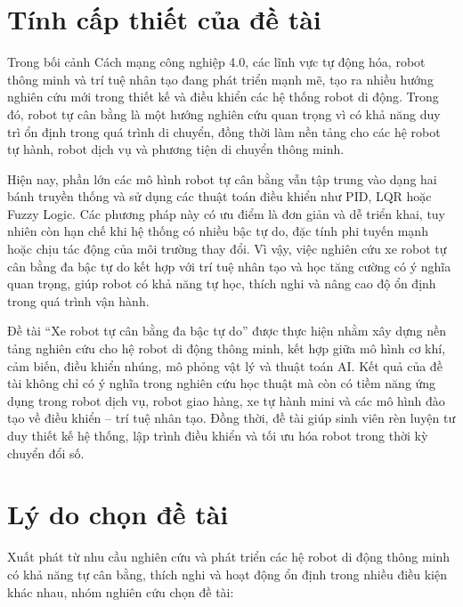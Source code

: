 \section{Tính cấp thiết của đề tài}

Trong bối cảnh Cách mạng công nghiệp 4.0, các lĩnh vực tự động hóa, robot thông minh
và trí tuệ nhân tạo đang phát triển mạnh mẽ, tạo ra nhiều hướng nghiên cứu mới trong
thiết kế và điều khiển các hệ thống robot di động. Trong đó, robot tự cân bằng là một
hướng nghiên cứu quan trọng vì có khả năng duy trì ổn định trong quá trình di chuyển,
đồng thời làm nền tảng cho các hệ robot tự hành, robot dịch vụ và phương tiện di chuyển
thông minh.

Hiện nay, phần lớn các mô hình robot tự cân bằng vẫn tập trung vào dạng hai bánh truyền
thống và sử dụng các thuật toán điều khiển như PID, LQR hoặc Fuzzy Logic. Các phương pháp
này có ưu điểm là đơn giản và dễ triển khai, tuy nhiên còn hạn chế khi hệ thống có nhiều
bậc tự do, đặc tính phi tuyến mạnh hoặc chịu tác động của môi trường thay đổi. Vì vậy,
việc nghiên cứu xe robot tự cân bằng đa bậc tự do kết hợp với trí tuệ nhân tạo và học
tăng cường có ý nghĩa quan trọng, giúp robot có khả năng tự học, thích nghi và nâng cao
độ ổn định trong quá trình vận hành.

Đề tài ``Xe robot tự cân bằng đa bậc tự do'' được thực hiện nhằm xây dựng nền tảng nghiên
cứu cho hệ robot di động thông minh, kết hợp giữa mô hình cơ khí, cảm biến, điều khiển
nhúng, mô phỏng vật lý và thuật toán AI. Kết quả của đề tài không chỉ có ý nghĩa trong
nghiên cứu học thuật mà còn có tiềm năng ứng dụng trong robot dịch vụ, robot giao hàng,
xe tự hành mini và các mô hình đào tạo về điều khiển -- trí tuệ nhân tạo. Đồng thời, đề
tài giúp sinh viên rèn luyện tư duy thiết kế hệ thống, lập trình điều khiển và tối ưu
hóa robot trong thời kỳ chuyển đổi số.

\section{Lý do chọn đề tài}

Xuất phát từ nhu cầu nghiên cứu và phát triển các hệ robot di động thông minh có khả
năng tự cân bằng, thích nghi và hoạt động ổn định trong nhiều điều kiện khác nhau,
nhóm nghiên cứu chọn đề tài:

